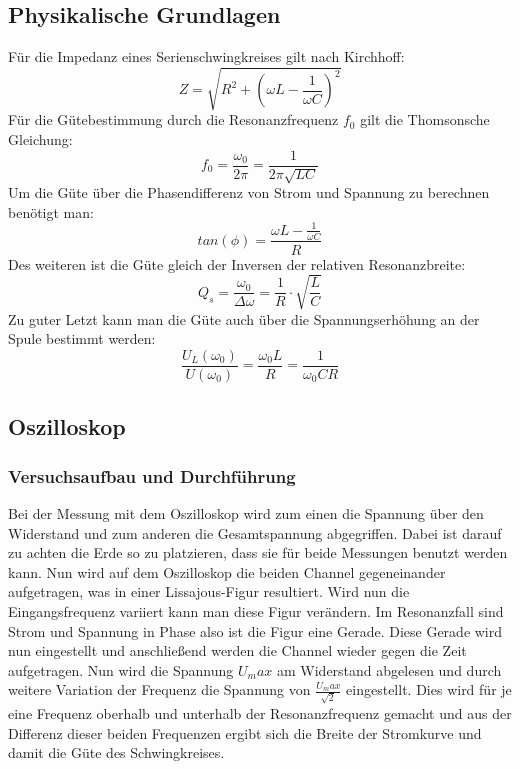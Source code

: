 \documentclass[12pt,a4paper]{article}
\begin{document}
\subsection{Physikalische Grundlagen}
Für die Impedanz eines Serienschwingkreises gilt nach Kirchhoff:
\begin{equation}
Z=\sqrt{R^2+(\omega L-\frac{1}{\omega C})^2}
\end{equation}
Für die Gütebestimmung durch die Resonanzfrequenz $f_0$ gilt die Thomsonsche Gleichung:
\begin{equation}
f_0=\frac{\omega_0}{2\pi}=\frac{1}{2\pi \sqrt{LC}}
\end{equation}
Um die Güte über die Phasendifferenz von Strom und Spannung zu berechnen benötigt man:
\begin{equation}
tan(\phi)=\frac{\omega L-\frac{1}{\omega C}}{R}
\end{equation}
Des weiteren ist die Güte gleich der Inversen der relativen Resonanzbreite:
\begin{equation}
Q_s=\frac{\omega_0}{\Delta \omega}=\frac{1}{R}\cdot \sqrt{\frac{L}{C}}
\end{equation}
Zu guter Letzt kann man die Güte auch über die Spannungserhöhung an der Spule bestimmt werden:
\begin{equation}
\frac{U_L(\omega_0)}{U(\omega_0)}=\frac{\omega_0 L}{R}=\frac{1}{\omega_0 C R}
\end{equation}
\subsection{Oszilloskop}
\subsubsection{Versuchsaufbau und Durchführung}
Bei der Messung mit dem Oszilloskop wird zum einen die Spannung über den Widerstand und zum anderen die Gesamtspannung abgegriffen. Dabei ist darauf zu achten die Erde so zu platzieren, dass sie für beide Messungen benutzt werden kann.
Nun wird auf dem Oszilloskop die beiden Channel gegeneinander aufgetragen, was in einer Lissajous-Figur resultiert. Wird nun die Eingangsfrequenz variiert kann man diese Figur verändern. Im Resonanzfall sind Strom und Spannung in Phase also ist die Figur eine Gerade. Diese Gerade wird nun eingestellt und anschließend werden die Channel wieder gegen die Zeit aufgetragen. Nun wird die Spannung $U_max$ am Widerstand abgelesen und durch weitere Variation der Frequenz die Spannung von $\frac{U_max}{\sqrt{2}}$ eingestellt. Dies wird für je eine Frequenz oberhalb und unterhalb der Resonanzfrequenz gemacht und aus der Differenz dieser beiden Frequenzen ergibt sich die Breite der Stromkurve und damit die Güte des Schwingkreises.
\end{document}
